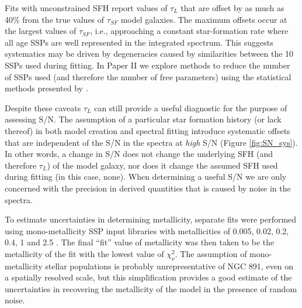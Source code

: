 Fits with unconstrained SFH report values of $\tau_L$ that are offset
by as much as 40\% from the true values of $\tau_{SF}$ model
galaxies. The maximum offsets occur at the largest values of
$\tau_{SF}$, i.e., approaching a constant star-formation rate where
all age SSPs are well represented in the integrated spectrum.  This
suggests systematics may be driven by degeneracies caused by
similarities between the 10 SSPs used during fitting.  In Paper II we
explore methods to reduce the number of SSPs used (and therefore the
number of free parameters) using the statistical methods presented by
\citet{Mosby15}.



Despite these caveats $\tau_L$ can still provide a useful diagnostic
for the purpose of assessing S/N. The assumption of a particular star
formation history (or lack thereof) in both model creation and
spectral fitting introduce systematic offsets that are independent of
the S/N in the spectra at {\it high} S/N (Figure \ref{fig:SN_sys}). In
other words, a change in S/N does not change the underlying SFH (and
therefore $\tau_L$) of the model galaxy, nor does it change the
assumed SFH used during fitting (in this case, none). When determining
a useful S/N we are only concerned with the precision in derived
quantities that is caused by noise in the spectra.

To estimate uncertainties in determining metallicity, separate fits
were performed using mono-metallicity SSP input libraries with
metallicities of 0.005, 0.02, 0.2, 0.4, 1 and 2.5 \Zsol.  The final
``fit'' value of metallicity was then taken to be the metallicity of
the fit with the lowest value of $\chi^2_\nu$. The assumption of
mono-metallicity stellar populations is probably unrepresentative of
NGC 891, even on a spatially resolved scale, but this simplification
provides a good estimate of the uncertainties in recovering the
metallicity of the model in the presence of random noise.

%
% 
% 
% 
% 
% 
%  
%

